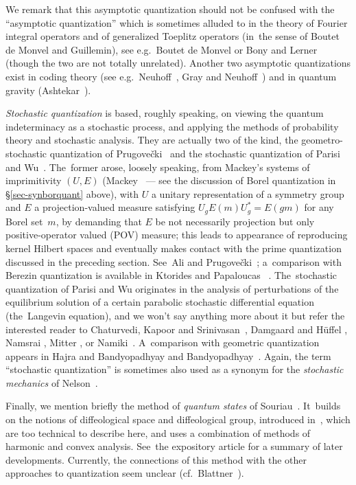 \documentclass[12pt]{amsart}
\numberwithin{equation}{section}
\theoremstyle{remark}
\begin{document}
We remark that this asymptotic quantization should not be confused with the
``asymptotic quantization'' which is sometimes alluded to in the theory of
Fourier integral operators and of generalized Toeplitz operators (in~the sense
of Boutet de Monvel and Guillemin), see e.g.~Boutet de Monvel \cite{bib:BdM} or
Bony and Lerner~\cite{bib:BLe} (though the two are not totally unrelated).
Another two asymptotic quantizations exist in coding theory (see
e.g.~Neuhoff~\cite{bib:Neuhof}, Gray and Neuhoff~\cite{bib:+GrNeu}) and in
quantum gravity (Ashtekar~\cite{bib:Ashte}).

{\it Stochastic quantization\/} is based, roughly speaking, on viewing the
quantum indeterminacy as a stochastic process, and applying the methods of
probability theory and stochastic analysis. They are actually two of the kind,
the geometro-stochastic quantization of Prugove\v cki~\cite{bib:Prug} and the
stochastic quantization of Parisi and Wu~\cite{bib:PaWu}. The~former arose,
loosely speaking, from Mackey's systems of imprimitivity $(U,E)$
(Mackey~\cite{bib:Mack} --- see the discussion of Borel quantization in
\S\ref{sec-synborquant} above), with $U$ a unitary representation of a symmetry
group and $E$ a projection-valued measure satisfying $U_g E(m) U^*_g =E(gm)$
for any Borel set~$m$, by demanding that $E$ be not necessarily projection but
only positive-operator valued (POV) measure; this leads to appearance of
reproducing kernel Hilbert spaces and eventually makes contact with the prime
quantization discussed in the preceding section. See~Ali and Prugove\v
cki~\cite{bib:AliPr}; a~comparison with Berezin quantization is available in
Ktorides and Papaloucas~ \cite{bib:KtoP}. The~stochastic quantization of Parisi
and Wu originates in the analysis of perturbations of the equilibrium solution
of a certain parabolic stochastic differential equation (the~Langevin
equation), and we won't say anything more about it but refer the interested
reader to Chaturvedi, Kapoor and Srinivasan~\cite{bib:ChKS}, Damgaard and
H\"uffel \cite{bib:Damg}, Namsrai \cite{bib:Namsr}, Mitter \cite{bib:Mitt},
or Namiki~\cite{bib:Namik}. A~comparison with geometric quantization appears in
Hajra and Bandyopadhyay \cite{bib:HajBan} and Bandyopadhyay~\cite{bib:+Bandy}.
Again, the term ``stochastic quantization'' is sometimes also used as a synonym
for the {\it stochastic mechanics\/} of Nelson~\cite{bib:NelsM}.

Finally, we mention briefly the method of {\it quantum states\/} of
Souriau~\cite{bib:SouQS}. It~builds on the notions of diffeological space and
diffeological group, introduced in~\cite{bib:SouDfg}, which are too technical
to describe here, and uses a combination of methods of harmonic and convex
analysis. See~the expository article \cite{bib:SouExp} for a summary of later
developments. Currently, the connections of this method with the other
approaches to quantization seem unclear (cf.~Blattner~\cite{bib:Blatt}).
\end{document}
